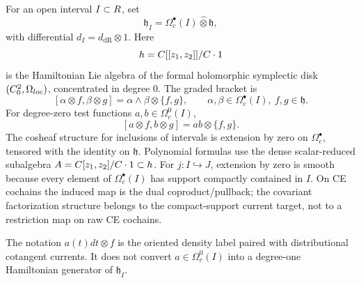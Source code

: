 \begin{defn}
\label{def:app-factorization-current-source}
  For an open interval \(I\subset R\), set
  \[
    \mathfrak h_I
      =\Omega^\bullet_c(I)\widehat\otimes\mathfrak h ,
  \]
  with differential \(d_I=d_{\mathrm{dR}}\otimes1\).  Here
  \[
    h=C[[z_1,z_2]]/C\cdot1
  \]
  is the Hamiltonian Lie algebra of the formal holomorphic symplectic
  disk \((C^2_0,\Omega_{loc})\), concentrated in
  degree \(0\).  The graded bracket is
  \[
    [\alpha\otimes f,\beta\otimes g]
      =\alpha\wedge\beta\otimes\{f,g\},
      \qquad
      \alpha,\beta\in\Omega^\bullet_c(I),\ f,g\in\mathfrak h .
  \]
  For degree-zero test functions \(a,b\in\Omega^0_c(I)\),
  \[
    [a\otimes f,b\otimes g]=ab\otimes\{f,g\}.
  \]
  The cosheaf structure for inclusions of intervals is extension by
  zero on \(\Omega^\bullet_c\), tensored with the identity on
  \(\mathfrak h\).  Polynomial formulas use the dense scalar-reduced
  subalgebra \(A=C[z_1,z_2]/C\cdot1\subset h\).
  For \(j:I\hookrightarrow J\), extension by zero is smooth because
  every element of \(\Omega_c^\bullet(I)\) has support compactly
  contained in \(I\).  On CE cochains the induced map is the dual
  coproduct/pullback; the covariant factorization structure belongs to
  the compact-support current target, not to a restriction map on raw
  CE cochains.

  The notation \(a(t)dt\otimes f\) is the oriented density label paired
  with distributional cotangent currents.  It does not convert
  \(a\in\Omega^0_c(I)\) into a degree-one Hamiltonian generator of
  \(\mathfrak h_I\).
\end{defn}

